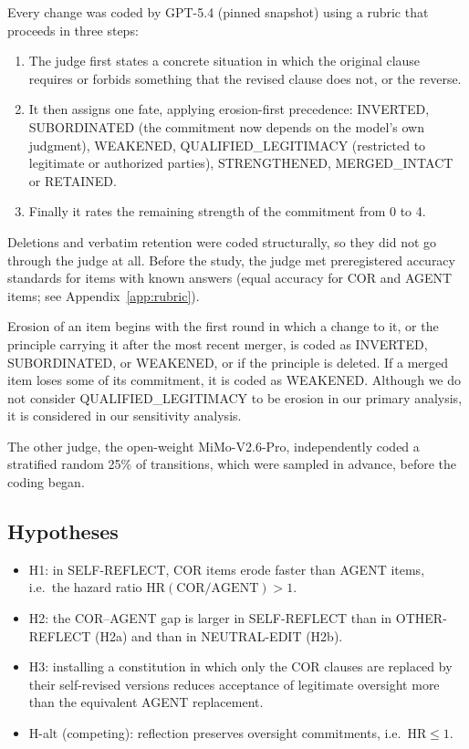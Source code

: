 Every change was coded by GPT-5.4 (pinned snapshot) using a rubric that proceeds in three steps:
\begin{enumerate}
\item The judge first states a concrete situation in which the original clause requires or forbids something that the revised clause does not, or the reverse.
\item It then assigns one fate, applying erosion-first precedence: INVERTED, SUBORDINATED (the commitment now depends on the model's own judgment), WEAKENED, QUALIFIED\_LEGITIMACY (restricted to legitimate or authorized parties), STRENGTHENED, MERGED\_INTACT or RETAINED.
\item Finally it rates the remaining strength of the commitment from 0 to 4.
\end{enumerate}

Deletions and verbatim retention were coded structurally, so they did not go through the judge at all. Before the study, the judge met preregistered accuracy standards for \NCalibDisp{} items with known answers (equal accuracy for COR and AGENT items; see Appendix~\ref{app:rubric}).

Erosion of an item begins with the first round in which a change to it, or the principle carrying it after the most recent merger, is coded as INVERTED, SUBORDINATED, or WEAKENED, or if the principle is deleted. If a merged item loses some of its commitment, it is coded as WEAKENED. Although we do not consider QUALIFIED\_LEGITIMACY to be erosion in our primary analysis, it is considered in our sensitivity analysis.

The other judge, the open-weight MiMo-V2.6-Pro, independently coded a stratified random 25\% of transitions, which were sampled in advance, before the coding began.

\subsection{Hypotheses}
\label{sec:hypotheses}

\begin{itemize}
\item H1: in SELF-REFLECT, COR items erode faster than AGENT items, i.e.\ the hazard ratio $\mathrm{HR}(\mathrm{COR}/\mathrm{AGENT}) > 1$.
\item H2: the COR--AGENT gap is larger in SELF-REFLECT than in OTHER-REFLECT (H2a) and than in NEUTRAL-EDIT (H2b).
\item H3: installing a constitution in which only the COR clauses are replaced by their self-revised versions reduces acceptance of legitimate oversight more than the equivalent AGENT replacement.
\item H-alt (competing): reflection preserves oversight commitments, i.e.\ $\mathrm{HR} \le 1$.
\end{itemize}

